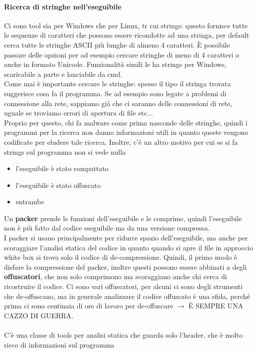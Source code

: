 \documentclass[12pt, oneside]{extbook}
\begin{document}
\paragraph{Ricerca di stringhe nell'eseguibile} Ci sono tool sia per Windows che per Linux, tr cui \textsf{strings}: questo fornisce tutte le sequenze di caratteri che possono essere ricondotte ad una stringa, per default cerca tutte le stringhe ASCII più lunghe di almeno 4 caratteri. È possibile passare delle opzioni per ad esempio cercare stringhe di meno di 4 caratteri o anche in formato Unicode. Funzionalità simili le ha strings per Windows, scaricabile a parte e lanciabile da cmd.\\ Come mai è importante cercare le stringhe: spesso il tipo il stringa trovata suggerisce cosa fa il programma. Se ad esempio sono legate a problemi di connessione alla rete, sappiamo già che ci saranno delle connessioni di rete, uguale se troviamo errori di apertura di file etc...\\ Proprio per questo, chi fa malware come prima nasconde delle stringhe, quindi i programmi per la ricerca non danno informazioni utili in quanto queste vengono codificate per eludere tale ricerca. Inoltre, c'è un altro motivo per cui se si fa strings sul programma non si vede nulla
\begin{itemize}
\item l'eseguibile è stato compattato
\item l'eseguibile è stato offuscato
\item entrambe
\end{itemize}
Un \textbf{packer} prende le funzioni dell'eseguibile e le comprime, quindi l'eseguibile non è più fatto dal codice eseguibile ma da una versione compressa.\\ I packer si usano principalmente per ridurre spazio dell'eseguibile, ma anche per scoraggiare l'analisi statica del codice in quanto quando si apre il file in approccio white box si trova solo il codice di de-compressione. Quindi, il primo modo è disfare la compressione del packer, inoltre questi possono essere abbinati a degli \textbf{offuscatori}, che non solo comprimono ma scoraggiano anche chi cerca di ricostruire il codice. Ci sono vari offuscatori, per alcuni ci sono degli strumenti che de-offuscano, ma in generale analizzare il codice offuscato è una sfida, perché prima ci sono centinaia di ore di lavoro per de-offuscare $\rightarrow$ È SEMPRE UNA CAZZO DI GUERRA.\\\\
C'è una classe di tools per analisi statica che guarda solo l'header, che è molto ricco di informazioni sul programma
\\
\end{document}
